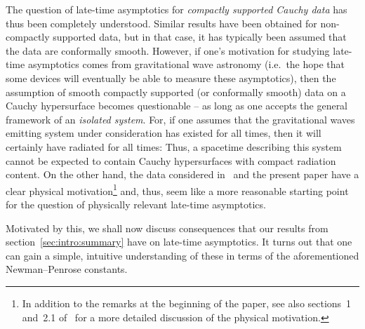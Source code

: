\documentclass[11pt,english]{article}
\numberwithin{equation}{section}
\theoremstyle{remark}
\theoremstyle{plain}
\theoremstyle{remark}
\renewcommand{\(}{\left(}
\renewcommand{\)}{\right)}
\begin{document}
The question of late-time asymptotics for \textit{compactly supported Cauchy data} has thus been completely understood. 
Similar results have been obtained for non-compactly supported data, but in that case, it has  typically been assumed that the data are conformally smooth.
However, if one's motivation for studying late-time asymptotics comes from gravitational wave astronomy (i.e.\ the hope that some devices will eventually be able to measure these asymptotics), then the assumption of smooth compactly supported (or conformally smooth) data on a Cauchy hypersurface becomes questionable -- as long as one accepts the general framework of an \textit{isolated system}. 
For, if one assumes that the gravitational waves emitting system under consideration has existed for all times, then it will certainly have radiated for all times: 
Thus, a spacetime describing this system cannot be expected to contain Cauchy hypersurfaces with compact radiation content. 
On the other hand, the data considered in~\cite{I} and the present paper have a clear physical motivation\footnote{In addition to the remarks at the beginning of the paper, see also sections~1 and~2.1 of~\cite{I} for a more detailed discussion of the physical motivation.} and, thus,  seem like a more reasonable starting point for the question of physically relevant late-time asymptotics.

Motivated by this, we shall now discuss consequences that our results from section~\ref{sec:intro:summary} have on late-time asymptotics.
It turns out that one can gain a simple, intuitive understanding of these in terms of the aforementioned Newman--Penrose constants. 
\end{document}
